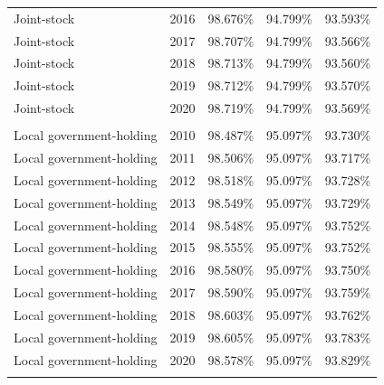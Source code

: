 \documentclass[
  12pt,
  a4paper,
]{scrreprt}
\begin{document}
{{{{\begin{longtable}[t]{llrrr}
\hspace{1em}Joint-stock & 2016 & 98.676\% & 94.799\% & 93.593\%\\
\hspace{1em}Joint-stock & 2017 & 98.707\% & 94.799\% & 93.566\%\\
\hspace{1em}Joint-stock & 2018 & 98.713\% & 94.799\% & 93.560\%\\
\hspace{1em}Joint-stock & 2019 & 98.712\% & 94.799\% & 93.570\%\\
\hspace{1em}Joint-stock & 2020 & 98.719\% & 94.799\% & 93.569\%\\
\addlinespace[0.3em]
\multicolumn{5}{l}{\textbf{Local government-holding}}\\
\hspace{1em}Local government-holding & 2010 & 98.487\% & 95.097\% & 93.730\%\\
\hspace{1em}Local government-holding & 2011 & 98.506\% & 95.097\% & 93.717\%\\
\hspace{1em}Local government-holding & 2012 & 98.518\% & 95.097\% & 93.728\%\\
\hspace{1em}Local government-holding & 2013 & 98.549\% & 95.097\% & 93.729\%\\
\hspace{1em}Local government-holding & 2014 & 98.548\% & 95.097\% & 93.752\%\\
\hspace{1em}Local government-holding & 2015 & 98.555\% & 95.097\% & 93.752\%\\
\hspace{1em}Local government-holding & 2016 & 98.580\% & 95.097\% & 93.750\%\\
\hspace{1em}Local government-holding & 2017 & 98.590\% & 95.097\% & 93.759\%\\
\hspace{1em}Local government-holding & 2018 & 98.603\% & 95.097\% & 93.762\%\\
\hspace{1em}Local government-holding & 2019 & 98.605\% & 95.097\% & 93.783\%\\
\hspace{1em}Local government-holding & 2020 & 98.578\% & 95.097\% & 93.829\%\\
\addlinespace[0.3em]

\end{longtable}}}}}
\end{document}
